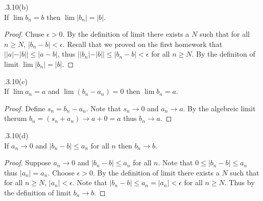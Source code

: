 \documentclass[12pt]{article}
\makeatletter
\theoremstyle{homework}
\newenvironment{exercise}[1]
{\def\@currentlabel{#1}\exercisecore}
{\endexercisecore}
\makeatother
\begin{document}
\begin{exercise}

2.3.10(b)\\
If $\lim b_n=b$ then $\lim |b_n|=|b|$.
\end{exercise}
\begin{proof}
Chuse $\epsilon>0$.  By the definition of limit there exists a $N$ such that for all $n\geq N$, $|b_n-b|<\epsilon$.  Recall that we proved on the first homework that  $||a| - |b|| \leq |a - b|$, thus $||b_n|-|b||\leq |b_n-b|<\epsilon$ for all $n\geq N$.  By the definiton of limit $\lim |b_n|=|b|$.
\end{proof}

\begin{exercise}

2.3.10(c)\\
If $\lim a_n=a$ and $\lim(b_n-a_n)=0$ then $\lim b_n=a$.
\end{exercise}
\begin{proof}
Define $s_n=b_n-a_n$.  Note that $s_n\rightarrow 0$ and $a_n\rightarrow a$.  By the algebreic limit therum $b_n=(s_n+a_n)\rightarrow a+0=a$ thus $b_n\rightarrow a$.
\end{proof}

\begin{exercise}

2.3.10(d)\\
If $a_n\rightarrow 0$ and $|b_n-b|\leq a_n$ for all $n$ then $b_n\rightarrow b$.
\end{exercise}
\begin{proof}
Suppose $a_n\rightarrow 0$ and $|b_n-b|\leq a_n$ for all $n$.  Note that $0\leq |b_n-b|\leq a_n$ thus $|a_n|=a_n$.  Choose $\epsilon>0$.  By the definition of limit there exists a $N$ such that for all $n\geq N$, $|a_n|<\epsilon$.  Note that $|b_n-b|\leq a_n=|a_n|<\epsilon$ for all $n\geq N$.  Thus by the definition of limit $b_n\rightarrow b$.
\end{proof}
\end{document}
